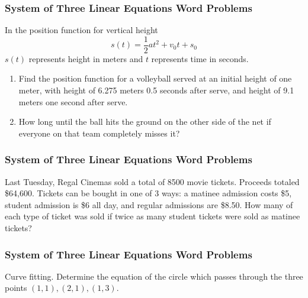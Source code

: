 \documentclass[xcolor=dvipsnames]{beamer}
\begin{document}
\begin{frame}
  \frametitle{System of Three Linear Equations Word Problems}
  {\ubung} In the position function for vertical height
  \begin{equation}
    \label{eq:eicheuth}
    s(t)=\frac{1}{2}at^{2}+v_{0}t+s_{0}
  \end{equation}
  $s(t)$ represents height in meters and $t$ represents time in
  seconds.
  \begin{enumerate}
  \item Find the position function for a volleyball served at an
    initial height of one meter, with height of 6.275 meters 0.5
    seconds after serve, and height of 9.1 meters one second after
    serve.
  \item How long until the ball hits the ground on the other side of
    the net if everyone on that team completely misses it?
  \end{enumerate}
\end{frame}

\begin{frame}
  \frametitle{System of Three Linear Equations Word Problems}
  {\ubung} Last Tuesday, Regal Cinemas sold a total of 8500 movie
  tickets. Proceeds totaled \$64,600. Tickets can be bought in one of
  3 ways: a matinee admission costs \$5, student admission is \$6 all
  day, and regular admissions are \$8.50. How many of each type of
  ticket was sold if twice as many student tickets were sold as
  matinee tickets?
\end{frame}

\begin{frame}
  \frametitle{System of Three Linear Equations Word Problems}
  {\ubung} Curve fitting. Determine the equation of the circle which
  passes through the three points $(1,1),(2,1),(1,3)$. 
\end{frame}
\end{document}
